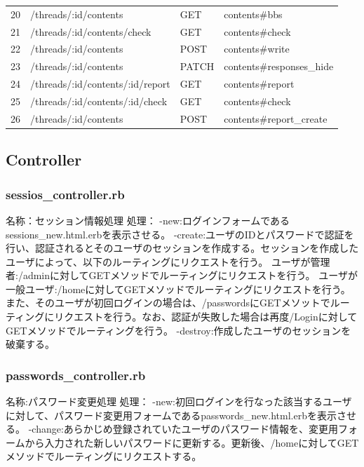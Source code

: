 \documentclass[a4j]{jarticle}
\begin{document}
\begin{table}[htb]
\begin{tabular}{|l|l|l||l|}
	20&	/threads/:id/contents      		 &    GET    & contents\#bbs        \\   
	21&	/threads/:id/contents/check 	&     GET    &  contents\#check   \\
	22&	/threads/:id/contents          	 &    POST  & contents\#write     \\
	23&	/threads/:id/contents          	 &    PATCH  & contents\#responses\_hide     \\
	24&	/threads/:id/contents/:id/report	 &    GET    & contents\#report    \\
	25&	/threads/:id/contents/:id/check   &   GET    &  contents\#check      \\
	26&	/threads/:id/contents            	 &   POST   & contents\#report\_create \\ \hline

\end{tabular}

\end{table}

\subsection{Controller}
\subsubsection{sessios\_controller.rb}
\noindent 名称：セッション情報処理	\newline
処理： \newline
-new:ログインフォームであるsessions\_new.html.erbを表示させる。\newline
-create:ユーザのIDとパスワードで認証を行い、認証されるとそのユーザのセッションを作成する。セッションを作成したユーザによって、以下のルーティングにリクエストを行う。\newline
ユーザが管理者:/adminに対してGETメソッドでルーティングにリクエストを行う。\newline
ユーザが一般ユーザ:/homeに対してGETメソッドでルーティングにリクエストを行う。また、そのユーザが初回ログインの場合は、/passwordsにGETメソットでルーティングにリクエストを行う。なお、認証が失敗した場合は再度/Loginに対してGETメソッドでルーティングを行う。\newline
-destroy:作成したユーザのセッションを破棄する。

\subsubsection{passwords\_controller.rb}
\noindent 名称:パスワード変更処理	\newline
処理：\newline
-new:初回ログインを行なった該当するユーザに対して、パスワード変更用フォームであるpasswords\_new.html.erbを表示させる。\newline
	-change:あらかじめ登録されていたユーザのパスワード情報を、変更用フォームから入力された新しいパスワードに更新する。更新後、/homeに対してGETメソッドでルーティングにリクエストする。
\end{document}
